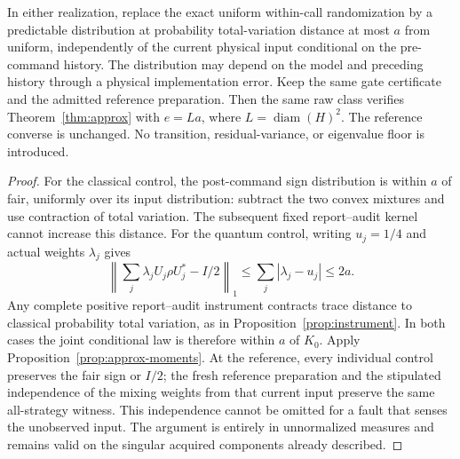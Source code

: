 \begin{corollary}\label{cor:raw-approx}
In either realization, replace the exact uniform within-call randomization by a predictable distribution at probability total-variation distance at most $a$ from uniform, independently of the current physical input conditional on the pre-command history. The distribution may depend on the model and preceding history through a physical implementation error. Keep the same gate certificate and the admitted reference preparation. Then the same raw class verifies Theorem~\ref{thm:approx} with $e=La$, where $L=\operatorname{diam}(H)^2$. The reference converse is unchanged. No transition, residual-variance, or eigenvalue floor is introduced.
\end{corollary}
\begin{proof}
For the classical control, the post-command sign distribution is within $a$ of fair, uniformly over its input distribution: subtract the two convex mixtures and use contraction of total variation. The subsequent fixed report--audit kernel cannot increase this distance. For the quantum control, writing $u_j=1/4$ and actual weights $\lambda_j$ gives
\[
 \left\|\sum_j\lambda_jU_j\rho U_j^*-I/2\right\|_1
 \le\sum_j|\lambda_j-u_j|\le2a.
\]
Any complete positive report--audit instrument contracts trace distance to classical probability total variation, as in Proposition~\ref{prop:instrument}. In both cases the joint conditional law is therefore within $a$ of $K_0$. Apply Proposition~\ref{prop:approx-moments}. At the reference, every individual control preserves the fair sign or $I/2$; the fresh reference preparation and the stipulated independence of the mixing weights from that current input preserve the same all-strategy witness. This independence cannot be omitted for a fault that senses the unobserved input. The argument is entirely in unnormalized measures and remains valid on the singular acquired components already described.
\end{proof}

